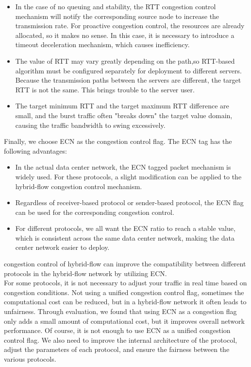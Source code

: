 \documentclass[conference]{IEEEtran}
\begin{document}
\begin{itemize}
\item  In the case of no queuing and stability, the RTT congestion control mechanism will notify the corresponding source node to increase the transmission rate. For proactive congestion control, the resources are already allocated, so it makes no sense. In this case, it is necessary to introduce a timeout deceleration mechanism, which causes inefficiency.
\item The value of RTT may vary greatly depending on the path,so RTT-based algorithm must be configured separately for deployment to different servers. Because the transmission paths between the servers are different, the target RTT is not the same. This brings trouble to the server user.
\item The target minimum RTT and the target maximum RTT difference are small, and the burst traffic often "breaks down" the target value domain, causing the traffic bandwidth to swing excessively.
\end{itemize}
\indent Finally, we choose ECN as the congestion control flag. The ECN tag has the following advantages:
\begin{itemize}
\item In the actual data center network, the ECN tagged packet mechanism is widely used. For these protocols, a slight modification can be applied to the hybrid-flow congestion control mechanism.
\item Regardless of receiver-based protocol or sender-based protocol, the ECN flag can be used for the corresponding congestion control.
\item For different protocols, we all want the ECN ratio to reach a stable value, which is consistent across the same data center network, making the data center network easier to deploy.
\end{itemize}
\indent congestion control of hybrid-flow can improve the compatibility between different protocols in the hybrid-flow network by utilizing ECN.\\
\indent For some protocols, it is not necessary to adjust your traffic in real time based on congestion conditions. Not using a unified congestion control flag, sometimes the computational cost can be reduced, but in a hybrid-flow network it often leads to unfairness. Through evaluation, we found that using ECN as a congestion flag only adds a small amount of computational cost, but it improves overall network performance. Of course, it is not enough to use ECN as a unified congestion control flag. We also need to improve the internal architecture of the protocol, adjust the parameters of each protocol, and ensure the fairness between the various protocols.
\end{document}
